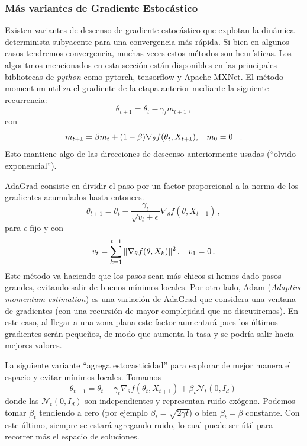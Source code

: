 \subsubsection{Más variantes de Gradiente Estocástico}
Existen variantes de descenso de gradiente estocástico que explotan la dinámica determinista subyacente para una convergencia más rápida. Si bien en algunos casos tendremos convergencia, muchas veces estos métodos son heurísticas. Los algoritmos mencionados en esta sección están disponibles en las principales bibliotecas de \textit{python} como \href{https://pytorch.org/docs/stable/optim.html#algorithms}{pytorch}, \href{https://www.tensorflow.org/api_docs/python/tf/keras/optimizers}{tensorflow} y \href{https://mxnet.apache.org/versions/1.7/api/python/docs/tutorials/packages/optimizer/index.html}{Apache MXNet}.
El método momentum utiliza el gradiente de la etapa anterior mediante la siguiente recurrencia:
$$ \theta_{t+1} = \theta_t - \gamma_t m_{t+1} \,,$$
con
$$ m_{t+1}=\beta m_t+(1-\beta)\nabla_\theta f(\theta_t,X_{t+1}), \hspace{.25cm}\, m_0=0\hspace{.25cm}\, .$$
Esto mantiene algo de las direcciones de descenso anteriormente usadas (``olvido exponencial'').

AdaGrad consiste en dividir el paso por un factor proporcional a la norma de los gradientes acumulados hasta entonces.
$$ \theta_{t+1}=\theta_t-\displaystyle \frac{\gamma_t}{\sqrt{v_t+\epsilon}}\nabla_\theta f(\theta,X_{t+1}) \,,$$
para $\epsilon$ fijo y con
$$ v_t = \displaystyle \sum^{t-1}_{k=1}\|\nabla_\theta f(\theta,X_k)\|^2\,,\hspace{.25cm}\, v_1=0\,.$$
Este método va haciendo que los pasos sean más chicos si hemos dado pasos grandes, evitando salir de buenos mínimos locales. Por otro lado, Adam (\textit{Adaptive momentum estimation}) es una variación de AdaGrad que considera una ventana de gradientes (con una recursión de mayor complejidad que no discutiremos). En este caso, al llegar a una zona plana este factor aumentará pues los últimos gradientes serán pequeños, de modo que aumenta la tasa y se podría salir hacia mejores valores.

La siguiente variante ``agrega estocasticidad'' para explorar de mejor manera el espacio y evitar mínimos locales. Tomamos
$$ \theta_{t+1}=\theta_t-\gamma_t\nabla_\theta f(\theta_t,X_{t+1}) + \beta_t \mathcal{N}_t(0,I_d)\,$$
donde las $\mathcal{N}_t(0,I_d)$ son independientes y representan ruido exógeno. Podemos tomar $\beta_t$ tendiendo a cero (por ejemplo $\beta_t=\sqrt{2\gamma t}$) o bien $\beta_t=\beta$ constante. Con este último, siempre se estará agregando ruido, lo cual puede ser útil para recorrer más el espacio de soluciones.

